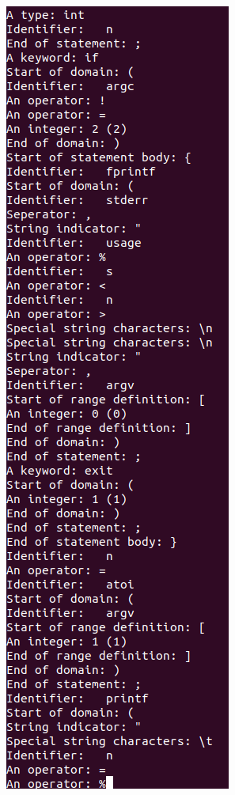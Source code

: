 \begin{multicols}{2}
\begin{figure}
    \includegraphics[width=\linewidth]{bilder/flex2.png}

\end{figure}
\end{multicols}
